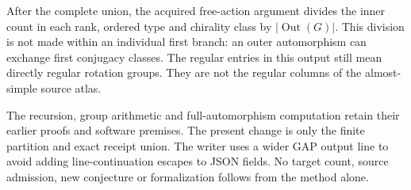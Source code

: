 \documentclass[11pt,a4paper]{article}
\begin{document}
After the complete union, the acquired free-action argument divides the
inner count in each rank, ordered type and chirality class by
$|\operatorname{Out}(G)|$. This division is not made within an individual
first branch: an outer automorphism can exchange first conjugacy classes.
The regular entries in this output still mean directly regular rotation
groups. They are not the regular columns of the almost-simple source atlas.

The recursion, group arithmetic and full-automorphism computation retain
their earlier proofs and software premises. The present change is only
the finite partition and exact receipt union. The writer uses a wider
GAP output line to avoid adding line-continuation escapes to JSON fields.
No target count, source admission, new conjecture or formalization follows
from the method alone.
\end{document}
